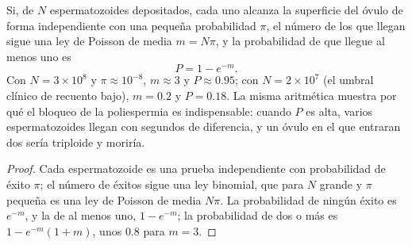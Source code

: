 \begin{theorem}\label{thm:b2:mammal-reproduction:poisson}
Si, de $N$ espermatozoides depositados, cada uno alcanza la superficie
del óvulo de forma independiente con una pequeña probabilidad $\pi$, el
número de los que llegan sigue una ley de Poisson de media $m = N\pi$, y
la probabilidad de que llegue al menos uno es
\[
P = 1 - e^{-m}.
\]
Con $N = 3\times 10^{8}$ y $\pi \approx 10^{-8}$, $m \approx 3$
y $P \approx 0.95$; con $N = 2\times 10^{7}$ (el umbral clínico de
recuento bajo), $m = 0.2$ y $P = 0.18$. La misma aritmética muestra por
qué el bloqueo de la poliespermia es indispensable: cuando
$P$ es alta, varios espermatozoides llegan con segundos de diferencia, y
un óvulo en el que entraran dos sería triploide y moriría.
\end{theorem}
\begin{proof}
Cada espermatozoide es una prueba independiente con probabilidad de éxito
$\pi$; el número de éxitos sigue una ley binomial, que para $N$ grande y
$\pi$ pequeña es una ley de Poisson de media $N\pi$. La probabilidad de
ningún éxito es $e^{-m}$, y la de al menos uno, $1 - e^{-m}$; la
probabilidad de dos o más es $1 - e^{-m}(1 + m)$, unos $0.8$ para
$m = 3$.
\end{proof}

